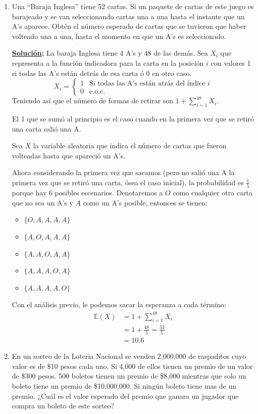 \documentclass[11pt,letterpaper]{report}
\newcommand{\sol}{\textbf{\underline{Solución}: }} %
\begin{document}
\begin{enumerate}
\item Una ``Baraja Inglesa'' tiene 52 cartas. Si un paquete de cartas de este juego es barajeado y
se van seleccionando cartas una a una hasta el instante que un A's aparece. Obtén el número esperado
de cartas que se tuvieron que haber volteado una a una, hasta el momento en que un A's es seleccionado.

\sol La baraja Inglesa tiene 4 A's y 48 de las demás. Sea $X_i$ que representa a la función indicadora
para la carta en la posición $i$ con valores 1 si todas las A's están detrás de esa carta ó 0 en
otro caso.
\[
    X_i =
        \begin{cases}
            1 & \text{Si todas las A's están atrás del índice $i$}\\
            0 & \text{e.o.c.}
        \end{cases}
\]
Teniendo así que el número de formas de retirar son $1 + \sum_{i=1}^{48} X_i$.

El 1 que se sumó al principio es el caso cuando en la primera vez que se retiró una carta salió una A.

Sea $X$ la variable aleatoria que indica el número de cartas que fueron volteadas hasta que apareció un A's.

Ahora considerando la primera vez que sacamos (pero no salió una A la primera vez que se retiró una
carta, ósea el caso inicial), la probabilidad es $\frac{1}{5}$ porque hay 6 posibles
escenarios. Denotaremos a $O$ como cualquier otra carta que no sea un A's y $A$ como un A's posible,
entonces se tienen:
\begin{itemize}
    \item $\{ O,A,A,A,A \}$
    \item $\{ A,O,A,A,A \}$
    \item $\{ A,A,O,A,A \}$
    \item $\{ A,A,A,O,A \}$
    \item $\{ A,A,A,A,O \}$
\end{itemize}

Con el análisis previo, le podemos sacar la esperanza a cada término:
\begin{align}
    \mathds{E}(X) 
        &= 1 + \sum_{i=1}^{48} X_i\\
        &= 1 + \frac{48}{5} = \frac{53}{5}\\
        &= 10.6
\end{align}

\item En un sorteo de la Loteria Nacional se venden 2,000,000 de raspaditos cuyo valor es de \$10
pesos cada uno. Si 4,000 de ellos tienen un premio de un valor de \$300 pesos. 500 boletos tienen un
premio de \$8,000 mientras que solo un boleto tiene un premio de \$10,000,000. Si ningún boleto tiene
mas de un premio. ¿Cuál es el valor esperado del premio que ganara un jugador que compra un boleto
de este sorteo?


\end{enumerate}
\end{document}
